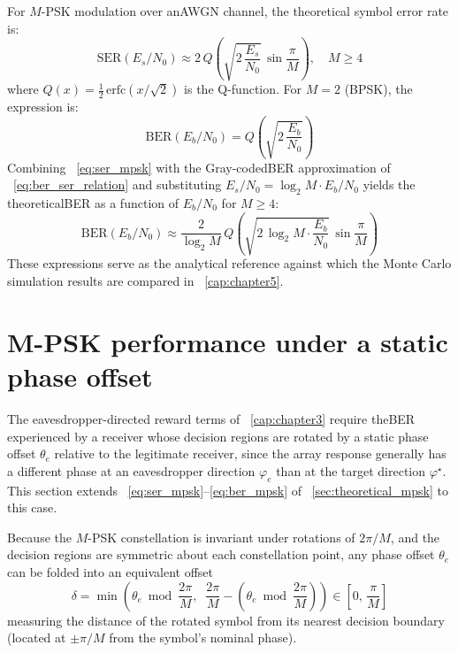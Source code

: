 For $M$-\gls{PSK} modulation over an\gls{AWGN} channel, the theoretical symbol error rate is:
\begin{equation}
    \label{eq:ser_mpsk}
    \mathrm{SER}(E_s/N_0) \approx 2\,Q\!\left(\sqrt{2\,\frac{E_s}{N_0}}\,\sin\frac{\pi}{M}\right), \quad M \geq 4
\end{equation}
where $Q(x) = \frac{1}{2}\,\mathrm{erfc}\!\left(x/\sqrt{2}\right)$ is the Q-function. For $M = 2$ (B\gls{PSK}), the expression is:
\begin{equation}
    \label{eq:ber_bpsk}
    \mathrm{BER}(E_b/N_0) = Q\!\left(\sqrt{2\,\frac{E_b}{N_0}}\right)
\end{equation}
Combining \equationname~\eqref{eq:ser_mpsk} with the Gray-coded\gls{BER} approximation of \equationname~\eqref{eq:ber_ser_relation} and substituting $E_s/N_0 = \log_2\!M \cdot E_b/N_0$ yields the theoretical\gls{BER} as a function of $E_b/N_0$ for $M \geq 4$:
\begin{equation}
    \label{eq:ber_mpsk}
    \mathrm{BER}(E_b/N_0) \approx \frac{2}{\log_2 M}\,Q\!\left(\sqrt{2\,\log_2\!M\cdot\frac{E_b}{N_0}}\,\sin\frac{\pi}{M}\right)
\end{equation}
These expressions serve as the analytical reference against which the Monte Carlo simulation results are compared in \chaptername~\ref{cap:chapter5}.

\section{M-PSK performance under a static phase offset}
\label{sec:ber_phase_offset}

The eavesdropper-directed reward terms of \chaptername~\ref{cap:chapter3} require the\gls{BER} experienced by a receiver whose decision regions are rotated by a static phase offset $\theta_e$ relative to the legitimate receiver, since the array response generally has a different phase at an eavesdropper direction $\varphi_e$ than at the target direction $\varphi^\star$. This section extends \equationname~\eqref{eq:ser_mpsk}--\eqref{eq:ber_mpsk} of \sectionname~\ref{sec:theoretical_mpsk} to this case.

Because the $M$-\gls{PSK} constellation is invariant under rotations of $2\pi/M$, and the decision regions are symmetric about each constellation point, any phase offset $\theta_e$ can be folded into an equivalent offset
\begin{equation}
    \delta = \min\!\left(\theta_e \bmod \frac{2\pi}{M},\;\; \frac{2\pi}{M} - \left(\theta_e \bmod \frac{2\pi}{M}\right)\right) \in \left[0,\, \frac{\pi}{M}\right]
    \label{eq:phase_offset_fold}
\end{equation}
measuring the distance of the rotated symbol from its nearest decision boundary (located at $\pm\pi/M$ from the symbol's nominal phase).

